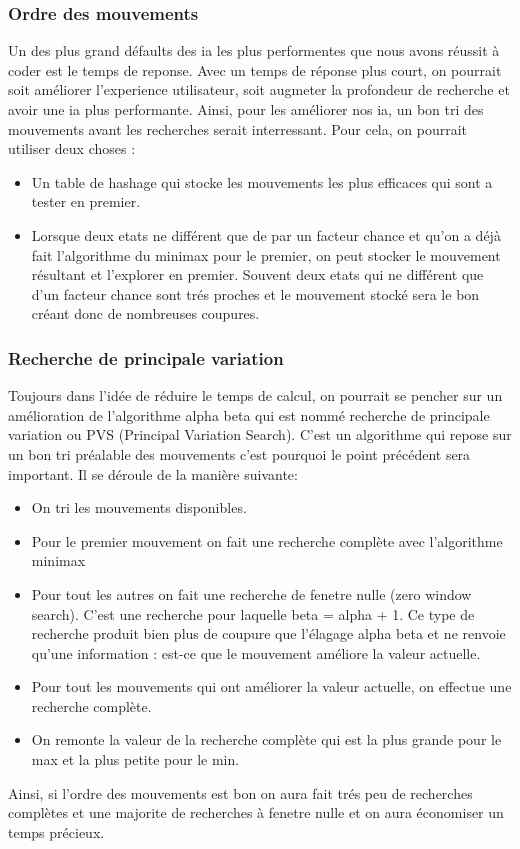         \subsubsection{Ordre des mouvements}
            Un des plus grand défaults des ia les plus performentes que nous avons réussit à coder est le temps de reponse. 
            Avec un temps de réponse plus court, on pourrait soit améliorer l'experience utilisateur, soit augmeter la profondeur de recherche et avoir une ia plus performante.
            Ainsi, pour les améliorer nos ia, un bon tri des mouvements avant les recherches serait interressant. Pour cela, on pourrait utiliser deux choses :
            \begin{itemize}
				\item Un table de hashage qui stocke les mouvements les plus efficaces qui sont a tester en premier.
				\item Lorsque deux etats ne différent que de par un facteur chance et qu'on a déjà fait l'algorithme du minimax pour le premier, on peut stocker le mouvement résultant et l'explorer en premier. Souvent deux etats qui ne différent que d'un facteur chance sont trés proches et le mouvement stocké sera le bon créant donc de nombreuses coupures.
			\end{itemize}
		\subsubsection{Recherche de principale variation}
		    Toujours dans l'idée de réduire le temps de calcul, on pourrait se pencher sur un amélioration de l'algorithme alpha beta qui est nommé recherche de principale variation ou PVS (Principal Variation Search).
		    C'est un algorithme qui repose sur un bon tri préalable des mouvements c'est pourquoi le point précédent sera important.
		    Il se déroule de la manière suivante:
		    \begin{itemize}
				\item On tri les mouvements disponibles.
				\item Pour le premier mouvement on fait une recherche complète avec l'algorithme minimax
				\item Pour tout les autres on fait une recherche de fenetre nulle (zero window search). C'est une recherche pour laquelle beta = alpha + 1. Ce type de recherche produit bien plus de coupure que l'élagage alpha beta et ne renvoie qu'une information : est-ce que le mouvement améliore la valeur actuelle.
				\item Pour tout les mouvements qui ont améliorer la valeur actuelle, on effectue une recherche complète.
				\item On remonte la valeur de la recherche complète qui est la plus grande pour le max et la plus petite pour le min.
			\end{itemize}
			Ainsi, si l'ordre des mouvements est bon on aura fait trés peu de recherches complètes et une majorite de recherches à fenetre nulle et on aura économiser un temps précieux.